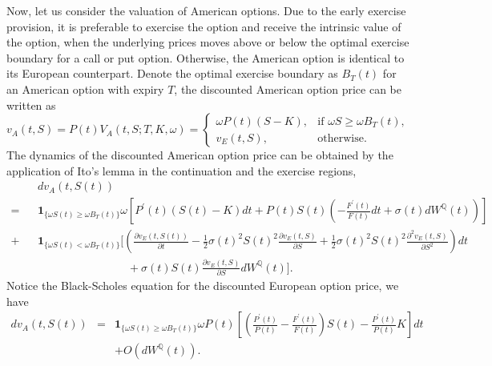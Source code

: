 \documentclass[12pt]{article}
\begin{document}
    Now, let us consider the valuation of American options. Due to the early exercise provision, it is preferable
    to exercise the option and receive the intrinsic value of the option, when the underlying prices moves above or
    below the optimal exercise boundary for a call or put option. Otherwise, the American option is identical to
    its European counterpart. Denote the optimal exercise boundary as $B_T(t)$ for an American option with expiry
    $T$, the discounted American option price can be written as
    \begin{equation}
      v_A(t,S)=P(t)V_A(t,S;T,K,\omega)
              =\begin{cases}
                 \omega P(t)\left(S-K\right), & \mbox{if } \omega S \geq \omega B_T(t),\\
                 v_E(t,S), & \mbox{otherwise}.
               \end{cases}
    \end{equation}
    The dynamics of the discounted American option price can be obtained by the application of Ito's lemma in the
    continuation and the exercise regions,
    \begin{eqnarray}
      &&dv_A(t,S(t)) \nonumber\\
      =&&\mathbf{1}_{\{\omega S(t) \geq \omega B_T(t)\}}\omega\left[P^{\prime}(t)\left(S(t)-K\right)dt
                  +P(t)S(t)\left(-\frac{F^{\prime}(t)}{F(t)}dt+\sigma(t)dW^{\mathbb{Q}}(t)\right)\right]\nonumber\\
      +  && \mathbf{1}_{\{\omega S(t)<\omega B_T(t)\}}\bigg[\left(\frac{\partial v_E(t,S(t))}{\partial t}-\frac{1}{2}\sigma(t)^2S(t)^2\frac{\partial v_E(t,S)}{\partial S}
               +\frac{1}{2}\sigma(t)^2S(t)^2\frac{\partial^2 v_E(t,S)}{\partial S^2}\right)dt\nonumber\\
               &&\quad\quad\quad\quad\quad\quad\quad\quad +\sigma(t)S(t)\frac{\partial v_E(t,S)}{\partial S}dW^{\mathbb{Q}}(t)\bigg].
    \end{eqnarray}
    Notice the Black-Scholes equation for the discounted European option price, we have
    \begin{eqnarray}
      dv_A(t,S(t))&=&\mathbf{1}_{\{\omega S(t)\geq\omega B_T(t)\}}\omega P(t)
                     \left[\left(\frac{P^{\prime}(t)}{P(t)}-\frac{F^{\prime}(t)}{F(t)}\right)S(t)
                           -\frac{P^{\prime}(t)}{P(t)}K\right]dt\nonumber\\
               && + O\left(dW^{\mathbb{Q}}(t)\right).
    \end{eqnarray}
\end{document}
